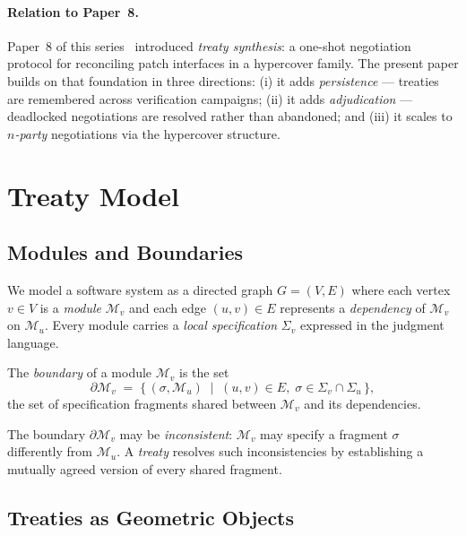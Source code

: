\documentclass[11pt]{article}
\newcommand{\Mod}{\mathcal{M}}            %
\newcommand{\Bdry}{\partial}             %
\newcommand{\ModSpec}[1]{\Sigma_{#1}}     %
\begin{document}
\paragraph{Relation to Paper~8.}
Paper~8 of this series~\cite{jugeo8} introduced \emph{treaty
synthesis}: a one-shot negotiation protocol for reconciling patch
interfaces in a hypercover family.  The present paper builds on
that foundation in three directions: (i) it adds \emph{persistence}
— treaties are remembered across verification campaigns; (ii) it
adds \emph{adjudication} — deadlocked negotiations are resolved
rather than abandoned; and (iii) it scales to \emph{$n$-party}
negotiations via the hypercover structure.

\section{Treaty Model}\label{sec:treaty-model}

\subsection{Modules and Boundaries}

We model a software system as a directed graph $G = (V, E)$ where
each vertex $v \in V$ is a \emph{module} $\Mod_v$ and each edge
$(u, v) \in E$ represents a \emph{dependency} of $\Mod_v$ on $\Mod_u$.
Every module carries a \emph{local specification} $\ModSpec{v}$
expressed in the \JuGeo{} judgment language.

\begin{definition}\label{def:boundary}
The \emph{boundary} of a module $\Mod_v$ is the set
\[
  \Bdry \Mod_v \;=\;
  \bigl\{\,(\sigma, \Mod_u) \;\mid\; (u,v) \in E,\;
    \sigma \in \ModSpec{v} \cap \ModSpec{u}\,\bigr\},
\]
\ie{} the set of specification fragments shared between $\Mod_v$ and
its dependencies.
\end{definition}

The boundary $\Bdry \Mod_v$ may be \emph{inconsistent}: $\Mod_v$
may specify a fragment $\sigma$ differently from $\Mod_u$.  A
\emph{treaty} resolves such inconsistencies by establishing a
mutually agreed version of every shared fragment.

\subsection{Treaties as Geometric Objects}
\end{document}
